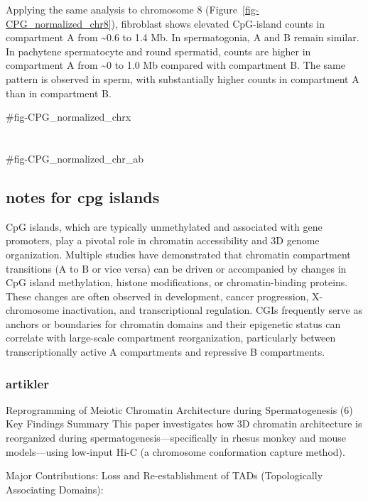 \documentclass[
  a4paper,
  openany]{scrbook}
\begin{document}
Applying the same analysis to chromosome 8
(Figure~\ref{fig-CPG_normalized_chr8}), fibroblast shows elevated
CpG-island counts in compartment A from \textasciitilde0.6 to 1.4 Mb. In
spermatogonia, A and B remain similar. In pachytene spermatocyte and
round spermatid, counts are higher in compartment A from
\textasciitilde0 to 1.0 Mb compared with compartment B. The same pattern
is observed in sperm, with substantially higher counts in compartment A
than in compartment B.

\#fig-CPG\_normalized\_chrx

\chapter{}\label{section}

\#fig-CPG\_normalized\_chr\_ab

\section{notes for cpg islands}\label{notes-for-cpg-islands}

CpG islands, which are typically unmethylated and associated with gene
promoters, play a pivotal role in chromatin accessibility and 3D genome
organization. Multiple studies have demonstrated that chromatin
compartment transitions (A to B or vice versa) can be driven or
accompanied by changes in CpG island methylation, histone modifications,
or chromatin-binding proteins. These changes are often observed in
development, cancer progression, X-chromosome inactivation, and
transcriptional regulation. CGIs frequently serve as anchors or
boundaries for chromatin domains and their epigenetic status can
correlate with large-scale compartment reorganization, particularly
between transcriptionally active A compartments and repressive B
compartments.

\subsection{artikler}\label{artikler}

Reprogramming of Meiotic Chromatin Architecture during Spermatogenesis
(6) Key Findings Summary This paper investigates how 3D chromatin
architecture is reorganized during spermatogenesis---specifically in
rhesus monkey and mouse models---using low-input Hi-C (a chromosome
conformation capture method).

Major Contributions: Loss and Re-establishment of TADs (Topologically
Associating Domains):
\end{document}
